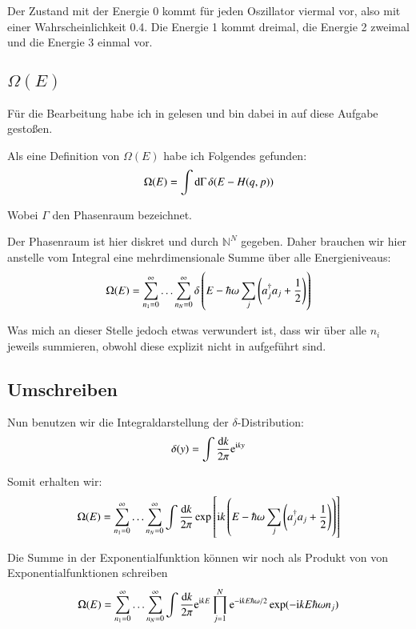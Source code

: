 Der Zustand mit der Energie 0 kommt für jeden Oszillator viermal vor, also mit
einer Wahrscheinlichkeit \num{.4}. Die Energie 1 kommt dreimal, die Energie 2
zweimal und die Energie 3 einmal vor.

\subsection{$\Omega(E)$}

Für die Bearbeitung habe ich in \cite{Schwabl/Statistische_Mechanik} gelesen
und bin dabei in \cite[Abschnitt~2.2.3.1]{Schwabl/Statistische_Mechanik} auf
diese Aufgabe gestoßen.

Als eine Definition von $\Omega(E)$ habe ich Folgendes gefunden: \parencite[Formel~2.2.4]{Schwabl/Statistische_Mechanik}
\[
    \Omega(E) = \int \dif \Gamma \, \delta(E - H(q, p))
\]

Wobei $\Gamma$ den Phasenraum bezeichnet.

Der Phasenraum ist hier diskret und durch $\mathbb N^N$ gegeben. Daher brauchen wir hier anstelle vom Integral eine mehrdimensionale Summe über alle Energieniveaus:
\[
    \Omega(E) =
    \sum_{n_1=0}^\infty
    \ldots
    \sum_{n_N=0}^\infty
    \delta\del{
        E - \hbar\omega \sum_j \del{a_j^\dagger a_j + \frac12}
    }
\]

Was mich an dieser Stelle jedoch etwas verwundert ist, dass wir über alle $n_i$ jeweils summieren, obwohl diese explizit nicht in \cite[Formel~2.2.25]{Schwabl/Statistische_Mechanik} aufgeführt sind.

\subsection{Umschreiben}

Nun benutzen wir die Integraldarstellung der $\delta$-Distribution:\parencite[Formel~2.2.4]{Schwabl/Statistische_Mechanik}
\[
    \delta(y) = \int \frac{\dif k}{2 \pi} \eup^{\iup k y}
\]

Somit erhalten wir:
\[
    \Omega(E) =
    \sum_{n_1=0}^\infty
    \ldots
    \sum_{n_N=0}^\infty
    \int \frac{\dif k}{2 \pi}
    \exp\sbr{
        \iup k \del{
            E - \hbar\omega \sum_j \del{a_j^\dagger a_j + \frac12}
        }
    }
\]

Die Summe in der Exponentialfunktion können wir noch als Produkt von von Exponentialfunktionen schreiben
\[
    \Omega(E) =
    \sum_{n_1=0}^\infty
    \ldots
    \sum_{n_N=0}^\infty
    \int \frac{\dif k}{2 \pi}
    \eup^{\iup k E}
    \prod_{j=1}^N
    \eup^{-\iup k E \hbar\omega /2}
    \exp( - \iup k E \hbar\omega n_j )
\]

